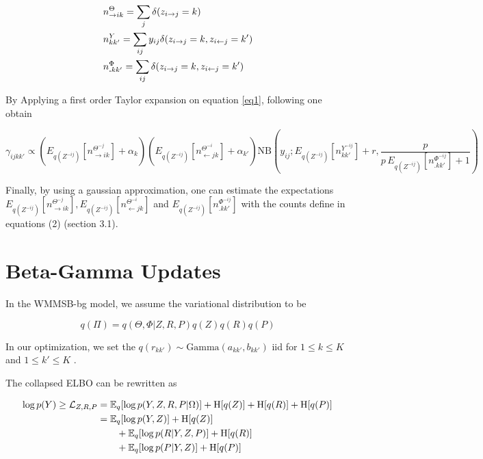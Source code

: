 \begin{align*}                                                                                                                                        
&n^{\Theta}_{\rightarrow ik} = \sum_j \delta(z_{i\rightarrow j}=k)\\
&n^{Y}_{kk'} = \sum_{ij} y_{ij}\delta(z_{i\rightarrow j}=k, z_{i\leftarrow j}=k') \\
&n^{\Phi}_{\bm{.}kk'} = \sum_{ij} \delta( z_{i\rightarrow j}=k, z_{i\leftarrow j}=k') 
\end{align*}   

By Applying a first order Taylor expansion on equation \eqref{eq1}, following \cite{teh2006collapsed} one obtain

\begin{equation}
\gamma_{ijkk'} \propto (E_{q(Z^{-ij})}[n_{\rightarrow ik}^{\Theta^{-j}}] + \alpha_k) (E_{q(Z^{-ij})}[n_{\leftarrow jk}^{\Theta^{-i}}] + \alpha_{k'}) \mathrm{NB}\left(y_{ij}; E_{q(Z^{-ij})}[n^{Y^{-ij}}_{kk'}] + r, \frac{p}{p\,E_{q(Z^{-ij})}[n^{\Phi^{-ij}}_{\bm{.}kk'}] + 1} \right)
\end{equation}

Finally, by using a gaussian approximation, one can estimate the expectations $E_{q(Z^{-ij})}[n_{\rightarrow ik}^{\Theta^{-j}}], E_{q(Z^{-ij})}[n_{\leftarrow jk}^{\Theta^{-i}}]$ and  $E_{q(Z^{-ij})}[n^{\Phi^{-ij}}_{\bm{.}kk'}]$ with the counts define in equations (2) (section 3.1).


\section{Beta-Gamma Updates}

In the WMMSB-bg model, we assume the variational distribution to be 

\begin{equation*}
q(\Pi) = q(\Theta, \Phi|Z, R, P) q(Z)q(R)q(P)
\end{equation*}

In our optimization, we set the $q(r_{kk'}) \sim \mathrm{Gamma}(a_{kk'}, b_{kk'})$ iid for $1\leq k \leq K$ and $1\leq k' \leq K$ . 

The collapsed ELBO can be rewritten as 

\begin{align*}
\log p(Y) \geq \mathcal{L}_{Z,R,P} &= \mathbb{E}_{q}[\log p(Y, Z, R, P|\Omega)] + \textrm{H}[q(Z)] + \textrm{H}[q(R)] + \textrm{H}[q(P)] \\
                        &= \mathbb{E}_{q}[\log p(Y, Z)] + \textrm{H}[q(Z)] \\
                        &\qquad + \mathbb{E}_{q}[\log p(R|Y,Z,P)] + \textrm{H}[q(R)] \\
                        &\qquad +\mathbb{E}_{q}[\log p(P|Y,Z)] + \textrm{H}[q(P)] 
\end{align*}

